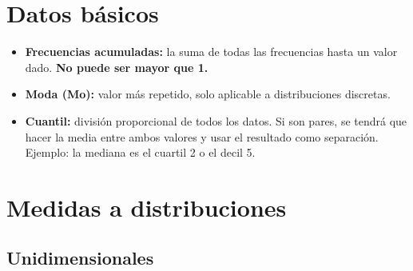 \documentclass[a4paper, twocolumn, 10pt]{article}
\begin{document}
	
\setlength{\belowdisplayskip}{0pt} \setlength{\belowdisplayshortskip}{0pt} 
\setlength{\abovedisplayskip}{0pt} \setlength{\abovedisplayshortskip}{0pt} %
	
\section{Datos básicos}
\begin{itemize}
	\item \textbf{Frecuencias acumuladas:} la suma de todas las frecuencias hasta un valor dado. \textbf{No puede ser mayor que 1.}
	\item \textbf{Moda (Mo):} valor más repetido, solo aplicable a distribuciones discretas.
	\item \textbf{Cuantil:} división proporcional de todos los datos. Si son pares, se tendrá que hacer la media entre ambos valores y usar el resultado como separación. Ejemplo: la mediana es el cuartil 2 o el decil 5. 
\end{itemize}

\section{Medidas a distribuciones}
\subsection{Unidimensionales}
\end{document}
